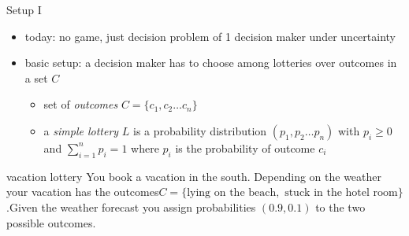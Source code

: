 \documentclass[bigger]{beamer}
\begin{document}
\begin{frame}[label={sec:orgcf940fe}]{Setup I}
\begin{itemize}
\item today: no game, just decision problem of 1 decision maker under uncertainty
\item basic setup: a decision maker has to choose among lotteries over outcomes in a set \(C\)

\begin{itemize}
\item set of \emph{outcomes} \(C=\{c_1,c_2\dots c_n\}\)
\item a \emph{simple lottery} \(L\) is a probability distribution \((p_1,p_2\dots p_n)\) with \(p_i\geq0\) and \(\sum_{i=1}^np_i=1\) where \(p_i\) is the probability of outcome \(c_i\)
\end{itemize}
\end{itemize}
\begin{block}{vacation lottery}
You book a vacation in the south. Depending on the weather your vacation has the outcomes\linebreak \(C=\{\text{lying on the beach}, \text{ stuck in the hotel room}\}\).\linebreak Given the weather forecast you assign probabilities \((0.9,0.1)\) to the two possible outcomes.
\end{block}
\end{frame}
\end{document}
